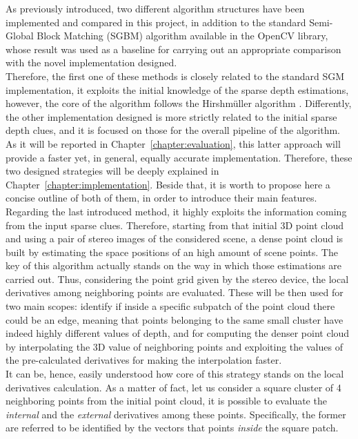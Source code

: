 As previously introduced, two different algorithm structures have been implemented and compared in this project, in addition to the standard Semi-Global Block Matching (SGBM) algorithm available in the OpenCV library, whose result was used as a baseline for carrying out an appropriate comparison with the novel implementation designed. \\
Therefore, the first one of these methods is closely related to the standard SGM implementation, it exploits the initial knowledge of the sparse depth estimations, however, the core of the algorithm follows the Hirshm\"{u}ller algorithm \cite{Hirschmuller2008}. 
Differently, the other implementation designed is more strictly related to the initial sparse depth clues, and it is focused on those for the overall pipeline of the algorithm.
As it will be reported in Chapter~\ref{chapter:evaluation}, this latter approach will provide a faster yet, in general, equally accurate implementation.
Therefore, these two designed strategies will be deeply explained in Chapter~\ref{chapter:implementation}.
Beside that, it is worth to propose here a concise outline of both of them, in order to introduce their main features.\\
Regarding the last introduced method, it highly exploits the information coming from the input sparse clues.
Therefore, starting from that initial 3D point cloud and using a pair of stereo images of the considered scene, a dense point cloud is built by estimating the space positions of an high amount of scene points. 
The key of this algorithm actually stands on the way in which those estimations are carried out. 
Thus, considering the point grid given by the stereo device, the local derivatives among neighboring points are evaluated. 
These will be then used for two main scopes: identify if inside a specific subpatch of the point cloud there could be an edge, meaning that points belonging to the same small cluster have indeed highly different values of depth, and for computing the denser point cloud by interpolating the 3D value of neighboring points and exploiting the values of the pre-calculated derivatives for making the interpolation faster.\\
It can be, hence, easily understood how core of this strategy stands on the local derivatives calculation. 
As a matter of fact, let us consider a square cluster of 4 neighboring points from the initial point cloud, it is possible to evaluate the \textit{internal} and the \textit{external} derivatives among these points.
Specifically, the former are referred to be identified by the vectors that points \textit{inside} the square patch. 
